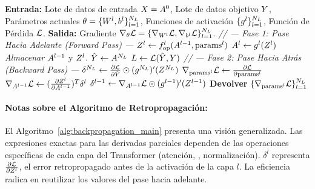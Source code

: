 \begin{algorithm}[H]
\caption{Algoritmo de Retropropagación Generalizado}
\label{alg:backpropagation_main}
\begin{algorithmic}[1]
    \State \textbf{Entrada:} Lote de datos de entrada $X = A^0$, Lote de datos objetivo $Y$, Parámetros actuales $\theta = \{ W^l, b^l \}_{l=1}^{N_L}$, Funciones de activación $\{ g^l \}_{l=1}^{N_L}$, Función de Pérdida $\mathcal{L}$.
    \State \textbf{Salida:} Gradiente $\nabla_{\theta} \mathcal{L} = \{ \nabla_{W^l} \mathcal{L}, \nabla_{b^l} \mathcal{L} \}_{l=1}^{N_L}$.
    \vspace{5pt}
    \Statex \textit{// --- Fase 1: Pase Hacia Adelante (Forward Pass) ---}
        \State $Z^l \leftarrow f_{\text{op}}^l(A^{l-1}, \text{params}^l)$ 
        \State $A^l \leftarrow g^l(Z^l)$ 
        \State \textit{Almacenar} $A^{l-1}$ y $Z^l$.
    \EndFor
    \State $\hat{Y} \leftarrow A^{N_L}$
    \State $L \leftarrow \mathcal{L}(\hat{Y}, Y)$
    \vspace{5pt}
    \Statex \textit{// --- Fase 2: Pase Hacia Atrás (Backward Pass) ---}
    \State $\delta^{N_L} \leftarrow \frac{\partial \mathcal{L}}{\partial \hat{Y}} \odot (g^{N_L})'(Z^{N_L})$ 
        \State $\nabla_{\text{params}^l} \mathcal{L} \leftarrow \frac{\partial \mathcal{L}}{\partial \text{params}^l}$ 
            \State $\nabla_{A^{l-1}} \mathcal{L} \leftarrow (\frac{\partial Z^l}{\partial A^{l-1}})^T \delta^l$
            \State $\delta^{l-1} \leftarrow \nabla_{A^{l-1}} \mathcal{L} \odot (g^{l-1})'(Z^{l-1})$ 
        \EndIf
    \EndFor
    \vspace{5pt}
    \State \textbf{Devolver} $\{ \nabla_{\text{params}^l} \mathcal{L} \}_{l=1}^{N_L}$
\end{algorithmic}
\end{algorithm}
\paragraph{Notas sobre el Algoritmo de Retropropagación:}
El Algoritmo~\ref{alg:backpropagation_main} presenta una visión generalizada. Las expresiones exactas para las derivadas parciales dependen de las operaciones específicas de cada capa del Transformer (atención, , normalización). $\delta^l$ representa $\frac{\partial \mathcal{L}}{\partial Z^l}$, el error retropropagado antes de la activación de la capa $l$. La eficiencia radica en reutilizar los valores del pase hacia adelante.

